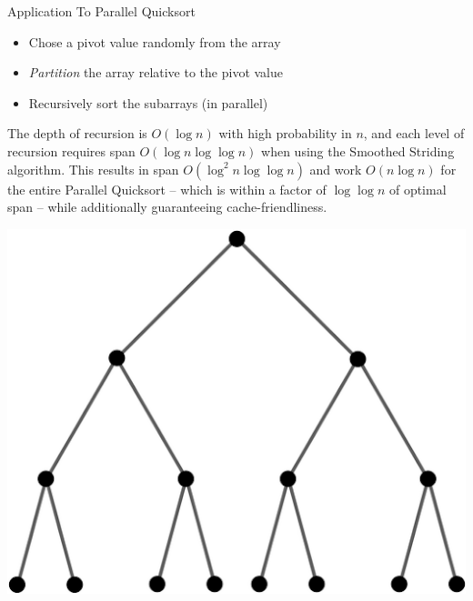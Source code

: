 \documentclass[table,serif,mathserif,final]{beamer}
\theoremstyle{remark}
\begin{document}
\begin{frame}{}
\begin{columns}[t]
\begin{column}{0.2\linewidth}
\begin{block}{\Huge Application To Parallel Quicksort}
  \begin{itemize}
    \item Chose a pivot value randomly from the array
    \item \emph{Partition} the array relative to the pivot value 
    \item Recursively sort the subarrays (in parallel)
  \end{itemize}

  The depth of recursion is $O(\log n)$ with high probability in $n$, and each
  level of recursion requires span $O(\log n \log \log n)$ when using the
  Smoothed Striding algorithm. This results in span $O(\log^2 n \log \log n)$
  and work $O(n\log n)$ for the entire Parallel Quicksort -- which is
  within a factor of $\log \log n$ of optimal span -- while additionally guaranteeing
   cache-friendliness.

  \begin{center}
  \includegraphics[width=0.45\linewidth]{imgs/tree.png}
  \end{center}
\end{block}

  \end{column}


\end{columns}
\end{frame}
\end{document}
